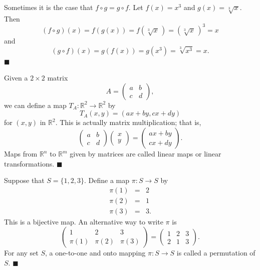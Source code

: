 \medskip
 
Sometimes it is the case that $f \circ g= g \circ f$.  Let $f(x) = x^3$ and $g(x) = \sqrt[3]{x}$. Then 
$$
(f \circ g )(x) = f(g(x)) = f( \sqrt[3]{x}\, ) = (\sqrt[3]{x}\, )^3 = x
$$
and
$$
(g \circ f )(x) = g(f(x)) = g( x^3) = \sqrt[3]{ x^3} = x.
$$
\hspace{\fill} $\blacksquare$
 
\medskip
 
Given a $2 \times 2$ matrix
$$
A =
\begin{pmatrix}
a & b \\
c & d
\end{pmatrix},
$$
we can define a map $T_A : {\mathbb R}^2 \rightarrow {\mathbb R}^2$ by 
$$
T_A (x,y) = (ax + by, cx +dy)
$$
for $(x,y)$ in ${\mathbb R}^2$.  This is actually matrix multiplication; that is,
$$
\begin{pmatrix}
a & b \\
c & d
\end{pmatrix}
\begin{pmatrix}
x \\ y
\end{pmatrix}
=
\begin{pmatrix}
ax + by \\
cx +dy
\end{pmatrix}.
$$
Maps from ${\mathbb R}^n$ to ${\mathbb R}^m$ given by matrices are called {\bfi linear maps\/} or {\bfi linear transformations}.
\hspace{\fill} $\blacksquare$

\medskip

Suppose that $S = \{ 1,2,3  \}$. Define a map $\pi :S\rightarrow S$ by 
\begin{eqnarray*}
\pi( 1 ) & = & 2 \\
\pi( 2 ) & = & 1 \\
\pi( 3 ) & = & 3.
\end{eqnarray*}
This is a bijective map.  An alternative way to  write $\pi$ is
$$
\begin{pmatrix}
1 & 2 & 3 \\
\pi(1) & \pi(2) & \pi(3)
\end{pmatrix}
=
\begin{pmatrix}
1 & 2 & 3 \\
2 & 1 & 3
\end{pmatrix}.
$$
For any set $S$, a one-to-one and onto mapping $\pi : S \rightarrow S$ is called a {\bfi permutation\/} of $S$. 
\hspace{\fill} $\blacksquare$

